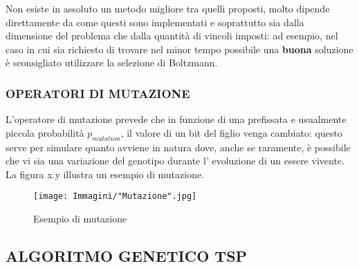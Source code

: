 \documentclass[11pt]{article}
\begin{document}
Non esiste in assoluto un metodo migliore tra quelli proposti, molto dipende direttamente da come questi sono implementati e soprattutto sia dalla dimensione del problema che dalla quantità di vincoli imposti: ad esempio, nel caso in cui sia richiesto di trovare nel minor tempo possibile una \textbf{buona} soluzione è sconsigliato utilizzare la selezione di Boltzmann.

\subsubsection*{OPERATORI DI MUTAZIONE}

L'operatore di mutazione prevede che in funzione di una prefissata e usualmente piccola probabilità $p_{mutation}$, il valore di un bit del figlio venga cambiato: questo serve per simulare quanto avviene in natura dove, anche se raramente, è possibile che vi sia una variazione del genotipo durante l' evoluzione di un essere vivente.
La figura x.y illustra un esempio di mutazione.

\begin{figure}[htbp]
    \centering
    \texttt{[image: Immagini/"Mutazione".jpg]}
    \caption{Esempio di mutazione}
\end{figure}

\subsection{ALGORITMO GENETICO TSP}
\label{sec:GeneticoTSPS}
\end{document}
